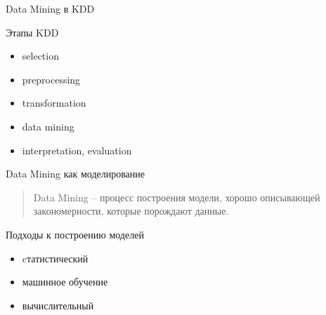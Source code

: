 \documentclass[aspectratio=169]{beamer}
\begin{document}
\begin{frame}{Data Mining в KDD}

Этапы KDD
\begin{itemize}
\item selection
\item preprocessing
\item transformation
\item data mining
\item interpretation, evaluation
\end{itemize}

\end{frame}

\begin{frame}{Data Mining как моделирование}

\begin{quote}{Data Mining}
-- процесс построения модели, хорошо описывающей закономерности, которые порождают данные.
\end{quote}

Подходы к построению моделей
\begin{itemize}
\item cтатистический
\item машинное обучение
\item вычислительный
\end{itemize}

\end{frame}
\end{document}
